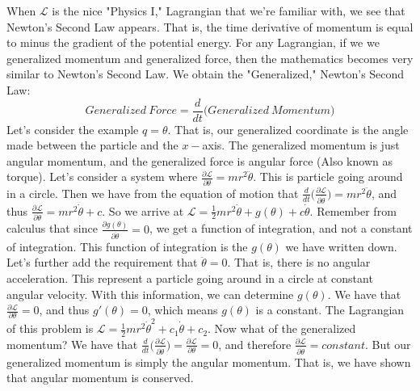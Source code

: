 \documentclass[crop=false,class=book]{standalone}
\begin{document}
When $\mathcal{L}$ is the nice "Physics I," Lagrangian that we're familiar with, we see that Newton's Second Law appears. That is, the time derivative of momentum is equal to minus the gradient of the potential energy. For any Lagrangian, if we we generalized momentum and generalized force, then the mathematics becomes very similar to Newton's Second Law. We obtain the "Generalized," Newton's Second Law:
\begin{equation}
\nonumber Generalized\ Force = \frac{d}{dt}\big(Generalized\ Momentum\big)
\end{equation}
Let's consider the example $q = \theta$. That is, our generalized coordinate is the angle made between the particle and the $x-$axis. The generalized momentum is just angular momentum, and the generalized force is angular force (Also known as torque). Let's consider a system where $\frac{\partial \mathcal{L}}{\partial \theta} = mr^2 \ddot{\theta}$. This is particle going around in a circle. Then we have from the equation of motion that $\frac{d}{dt}\big(\frac{\partial \mathcal{L}}{\partial \dot{\theta}}\big) = mr^2 \ddot{\theta}$, and thus $\frac{\partial \mathcal{L}}{\partial \dot{\theta}} = mr^2\dot{\theta} +c$. So we arrive at $\mathcal{L} = \frac{1}{2}mr^2\dot{\theta} + g(\theta) + c\dot{\theta}$. Remember from calculus that since $\frac{\partial g(\theta)}{\partial \dot{\theta}} = 0$, we get a function of integration, and not a constant of integration. This function of integration is the $g(\theta)$ we have written down. Let's further add the requirement that $\ddot{\theta} = 0$. That is, there is no angular acceleration. This represent a particle going around in a circle at constant angular velocity. With this information, we can determine $g(\theta)$. We have that $\frac{\partial \mathcal{L}}{\partial \theta} = 0$, and thus $g'(\theta) = 0$, which means $g(\theta)$ is a constant. The Lagrangian of this problem is $\mathcal{L} = \frac{1}{2}mr^2 \dot{\theta}^2+ c_1 \dot{\theta}+c_2$. Now what of the generalized momentum? We have that $\frac{d}{dt}\big(\frac{\partial \mathcal{L}}{\partial \dot{\theta}}\big) = \frac{\partial \mathcal{L}}{\partial \theta} = 0$, and therefore $\frac{\partial \mathcal{L}}{\partial \dot{\theta}} = constant$. But our generalized momentum is simply the angular momentum. That is, we have shown that angular momentum is conserved.
\end{document}
